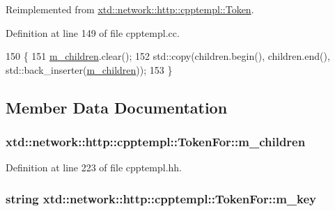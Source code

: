Reimplemented from \hyperlink{classxtd_1_1network_1_1http_1_1cpptempl_1_1Token_adc8822088b8b9a148b755bc25cd1df6e}{xtd\-::network\-::http\-::cpptempl\-::\-Token}.



Definition at line 149 of file cpptempl.\-cc.


\begin{DoxyCode}
150 \{
151   \hyperlink{classxtd_1_1network_1_1http_1_1cpptempl_1_1TokenFor_a2ee55240eafb3c90b7a0c96c0ad253a5}{m\_children}.clear();
152   std::copy(children.begin(), children.end(), std::back\_inserter(\hyperlink{classxtd_1_1network_1_1http_1_1cpptempl_1_1TokenFor_a2ee55240eafb3c90b7a0c96c0ad253a5}{m\_children}));
153 \}
\end{DoxyCode}


\subsection{Member Data Documentation}
\hypertarget{classxtd_1_1network_1_1http_1_1cpptempl_1_1TokenFor_a2ee55240eafb3c90b7a0c96c0ad253a5}{
\subsubsection[{m\-\_\-children}]{ xtd\-::network\-::http\-::cpptempl\-::\-Token\-For\-::m\-\_\-children}}\label{classxtd_1_1network_1_1http_1_1cpptempl_1_1TokenFor_a2ee55240eafb3c90b7a0c96c0ad253a5}


Definition at line 223 of file cpptempl.\-hh.

\hypertarget{classxtd_1_1network_1_1http_1_1cpptempl_1_1TokenFor_a30879f48f3ad6e5e61f6191a702743e4}{
\subsubsection[{m\-\_\-key}]{\setlength{\rightskip}{0pt plus 5cm}string xtd\-::network\-::http\-::cpptempl\-::\-Token\-For\-::m\-\_\-key}}\label{classxtd_1_1network_1_1http_1_1cpptempl_1_1TokenFor_a30879f48f3ad6e5e61f6191a702743e4}



